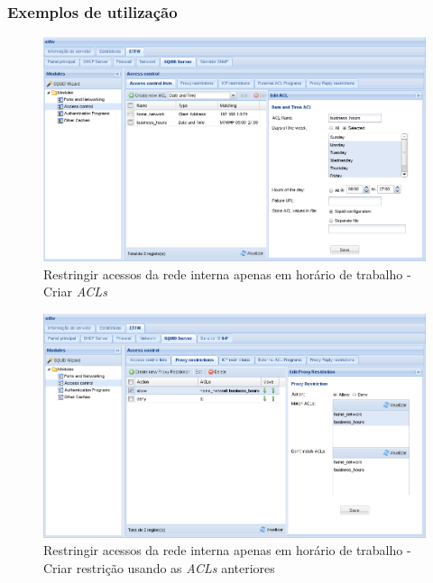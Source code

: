 \subsubsection{Exemplos de utilização}

\begin{figure}[H]
    \begin{center}
    \includegraphics[scale=0.38]{screenshots/etfw/etfw_squid_example_time_01_01.png}
    \caption{Restringir acessos da rede interna apenas em horário de trabalho - Criar \textit{ACLs}}
    \label{fig:etfw_squid_example_time_01_01}
    \end{center}
\end{figure}

\begin{figure}[H]
    \begin{center}
    \includegraphics[scale=0.38]{screenshots/etfw/etfw_squid_example_time_01_02.png}
    \caption{Restringir acessos da rede interna apenas em horário de trabalho - Criar restrição usando as \textit{ACLs} anteriores}
    \label{fig:etfw_squid_example_time_01_02}
    \end{center}
\end{figure}

